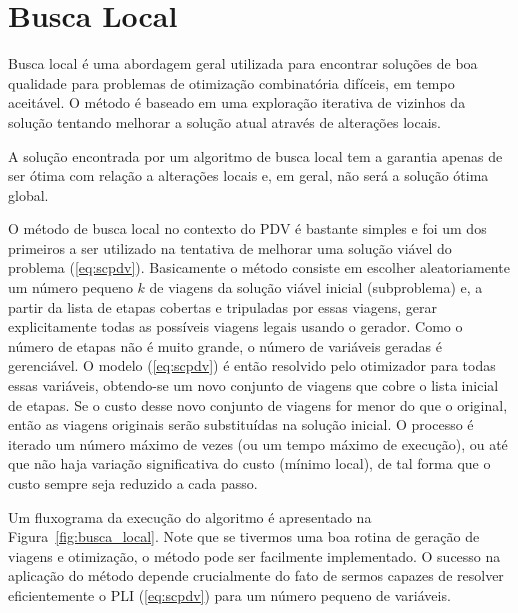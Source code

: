 \section{Busca Local}
\label{sec:metodos_busca}

Busca local é uma abordagem geral utilizada para encontrar soluções de boa qualidade para problemas
de otimização combinatória difíceis, em tempo aceitável. O método é baseado em uma exploração 
iterativa de vizinhos da solução tentando melhorar a solução atual através de alterações locais.

A solução encontrada por um algoritmo de busca local tem a garantia apenas de ser ótima com relação
a alterações locais e, em geral, não será a solução ótima global.

O método de busca local no contexto do PDV é bastante simples e foi um dos primeiros a ser utilizado
na tentativa de melhorar uma solução viável do problema (\ref{eq:scpdv}). Basicamente o método
consiste em escolher aleatoriamente um número pequeno $k$ de viagens da solução viável inicial
(subproblema) e, a partir da lista de etapas cobertas e tripuladas por essas viagens, gerar
explicitamente todas as possíveis viagens legais usando o gerador. Como o número de etapas não é
muito grande, o número de variáveis geradas é gerenciável. O modelo (\ref{eq:scpdv}) é então
resolvido pelo otimizador para todas essas variáveis, obtendo-se um novo conjunto de viagens que
cobre o lista inicial de etapas. Se o custo desse novo conjunto de viagens for menor do que o
original, então as viagens originais serão substituídas na solução inicial. O processo é iterado um
número máximo de vezes (ou um tempo máximo de execução), ou até que não haja variação significativa
do custo (mínimo local), de tal forma que o custo sempre seja reduzido a cada passo.

Um fluxograma da execução do algoritmo é apresentado na Figura~\ref{fig:busca_local}. Note que se
tivermos uma boa rotina de geração de viagens e otimização, o método pode ser facilmente 
implementado. O sucesso na aplicação do método depende crucialmente do fato de sermos capazes de 
resolver eficientemente o PLI (\ref{eq:scpdv}) para um número pequeno de variáveis.

